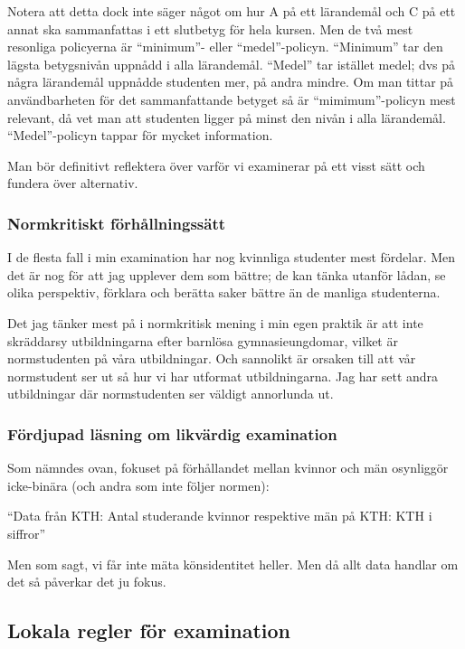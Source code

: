 Notera att detta dock inte säger något om hur A på ett lärandemål och C
på ett annat ska sammanfattas i ett slutbetyg för hela kursen. Men de
två mest resonliga policyerna är ``minimum''- eller ``medel''-policyn.
``Minimum'' tar den lägsta betygsnivån uppnådd i alla lärandemål.
``Medel'' tar istället medel; dvs på några lärandemål uppnådde studenten
mer, på andra mindre. Om man tittar på användbarheten för det
sammanfattande betyget så är ``mimimum''-policyn mest relevant, då vet
man att studenten ligger på minst den nivån i alla lärandemål.
``Medel''-policyn tappar för mycket information.

Man bör definitivt reflektera över varför vi examinerar på ett visst
sätt och fundera över alternativ.

\subsubsection{Normkritiskt förhållningssätt}%
\label{normkritiskt-förhållningssätt}

I de flesta fall i min examination har nog kvinnliga studenter mest
fördelar. Men det är nog för att jag upplever dem som bättre; de kan
tänka utanför lådan, se olika perspektiv, förklara och berätta saker
bättre än de manliga studenterna.

Det jag tänker mest på i normkritisk mening i min egen praktik är att
inte skräddarsy utbildningarna efter barnlösa gymnasieungdomar, vilket
är normstudenten på våra utbildningar.
Och sannolikt är orsaken till att vår normstudent ser ut så hur vi har utformat 
utbildningarna.
Jag har sett andra utbildningar där normstudenten ser väldigt annorlunda ut.

\subsubsection{Fördjupad läsning om likvärdig examination}%
\label{fördjupad-läsning-om-likvärdig-examination}

Som nämndes ovan, fokuset på förhållandet mellan kvinnor och män
osynliggör icke-binära (och andra som inte följer normen):

``Data från KTH: Antal studerande kvinnor respektive män på KTH: KTH i
siffror''

Men som sagt, vi får inte mäta könsidentitet heller. Men då allt
data handlar om det så påverkar det ju fokus.

\subsection{Lokala regler för examination}%
\label{lokala-regler-examination}

